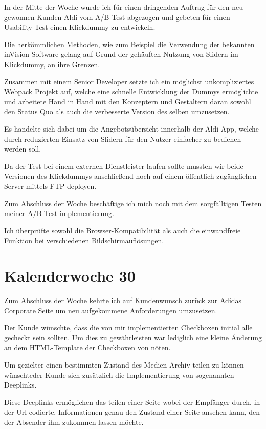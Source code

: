\documentclass[11pt]{article} %
\begin{document}
In der Mitte der Woche wurde ich für einen dringenden Auftrag für den neu gewonnen Kunden Aldi vom A/B-Test abgezogen und gebeten für einen Usability-Test einen Klickdummy zu entwickeln.

Die herkömmlichen Methoden, wie zum Beispiel die Verwendung der bekannten inVision Software gelang auf Grund der gehäuften Nutzung von Slidern im Klickdummy, an ihre Grenzen.

Zusammen mit einem Senior Developer setzte ich ein möglichst unkompliziertes Webpack Projekt auf, welche eine schnelle Entwicklung der Dummys ermöglichte und arbeitete Hand in Hand mit den Konzeptern und Gestaltern daran sowohl den Status Quo als auch die verbesserte Version des selben umzusetzen.

Es handelte sich dabei um die Angebotsübersicht innerhalb der Aldi App, welche durch reduzierten Einsatz von Slidern für den Nutzer einfacher zu bedienen werden soll.

Da der Test bei einem externen Dienstleister laufen sollte mussten wir beide Versionen des Klickdummys anschließend noch auf einem öffentlich zugänglichen Server mittels FTP deployen.

Zum Abschluss der Woche beschäftige ich mich noch mit dem sorgfälltigen Testen meiner A/B-Test implementierung.

Ich überprüfte sowohl die Browser-Kompatibilität als auch die einwandfreie Funktion bei verschiedenen Bildschirmauflösungen.

\section{Kalenderwoche 30} \label{sec:kw30}

Zum Abschluss der Woche kehrte ich auf Kundenwunsch zurück zur Adidas Corporate Seite um neu aufgekommene Anforderungen umzusetzen.

Der Kunde wünschte, dass die von mir implementierten Checkboxen initial alle gecheckt sein sollten. Um dies zu gewährleisten war lediglich eine kleine Änderung an dem HTML-Template der Checkboxen von nöten. 

Um gezielter einen bestimmten Zustand des Medien-Archiv teilen zu können wünschteder Kunde sich zusätzlich die Implementierung von sogenannten Deeplinks.

Diese Deeplinks ermöglichen das teilen einer Seite wobei der Empfänger durch, in der Url codierte, Informationen genau den Zustand einer Seite ansehen kann, den der Absender ihm zukommen lassen möchte.
\end{document}
